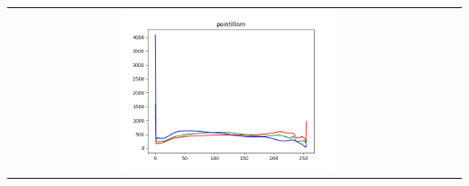 \documentclass{article}
\begin{document}
\begin{center}
\begin{tabular}{cc}
				\includegraphics[width=0.5\textwidth]{plots/pointillism.png}\par

			\end{tabular}
		\end{center}
		\newpage

		\begin{center}
			\begin{tabular}{cc}


\end{tabular}
\end{center}
\end{document}
